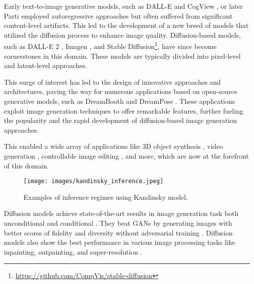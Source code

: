 \documentclass[11pt]{article}
\begin{document}
Early text-to-image generative models, such as DALL-E \cite{DBLP:conf/icml/RameshPGGVRCS21} and CogView \cite{DBLP:conf/nips/DingYHZZYLZSYT21}, or later Parti \cite{DBLP:journals/tmlr/YuXKLBWVKYAHHPLZBW22} employed autoregressive approaches but often suffered from significant content-level artifacts. This led to the development of a new breed of models that utilized the diffusion process to enhance image quality. Diffusion-based models, such as DALL-E 2 \cite{ramesh2022hierarchical}, Imagen \cite{saharia2022photorealistic}, and Stable Diffusion\footnote{\url{https://github.com/CompVis/stable-diffusion}}, have since become cornerstones in this domain. These models are typically divided into pixel-level \cite{ramesh2022hierarchical, saharia2022photorealistic} and latent-level \cite{rombach2022highresolution} approaches.

This surge of interest has led to the design of innovative approaches and architectures, paving the way for numerous applications based on open-source generative models, such as DreamBooth \cite{ruiz2022dreambooth} and DreamPose \cite{karras2023dreampose}. These applications exploit image generation techniques to offer remarkable features, further fueling the popularity and the rapid development of diffusion-based image generation approaches.

This enabled a wide array of applications like 3D object synthesis \cite{DBLP:conf/iclr/PooleJBM23, DBLP:journals/corr/abs-2303-14184, DBLP:journals/corr/abs-2211-10440, DBLP:journals/corr/abs-2303-13873}, video generation \cite{DBLP:conf/nips/HoSGC0F22, DBLP:journals/corr/abs-2303-08320, DBLP:journals/corr/abs-2210-02303, DBLP:conf/iclr/SingerPH00ZHYAG23, DBLP:journals/corr/abs-2304-08818, DBLP:journals/corr/abs-2302-03011}, controllable image editing \cite{DBLP:conf/iclr/HertzMTAPC23, DBLP:conf/siggraph/ParmarS0LLZ23, DBLP:journals/corr/abs-2210-16056, DBLP:journals/corr/abs-2307-02421, DBLP:journals/corr/abs-2307-12493}, and more, which are now at the forefront of this domain.

\begin{figure*}
  \centering
  \texttt{[image: images/kandinsky\_inference.jpeg]}
  \caption{Examples of inference regimes using Kandinsky model.}
  \label{fig_inference_regimes}
\end{figure*}


Diffusion models achieve state-of-the-art results in image generation task both unconditional \cite{ho2020denoising, nichol2021improved} and conditional \cite{peebles2022scalable}. They beat GANs \cite{NIPS2014_5ca3e9b1} by generating images with better scores of fidelity and diversity without adversarial training \cite{dhariwal2021diffusion}. Diffusion models also show the best performance in various image processing tasks like inpainting, outpainting, and super-resolution \cite{batzolis2021conditional, saharia2022palette}.
\end{document}
